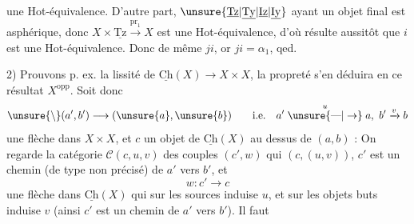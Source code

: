 une Hot-équivalence. D'autre part, $\unsure{\underline{\mathrm{Tz}}|\underline{\mathrm{Ty}}|\underline{\mathrm{Iz}}|\underline{\mathrm{Iy}}}$ ayant un objet final est asphérique, donc $X\times\underline{\mathrm{Tz}}\xrightarrow{\mathrm{pr}_1}X$ est une Hot-équivalence, d'où résulte aussitôt que $i$ est une Hot-équivalence. Donc de même $ji$, or $ji=\alpha_1$, qed.

2) Prouvons p. ex. la lissité de $\underline{\mathrm{Ch}}(X)\to X\times X$, la propreté s'en déduira en  ce résultat  $X^{\mathrm{opp}}$. Soit donc
\[
\unsure{\backslash}(a',b')\longrightarrow(\unsure{a},\unsure{b})\qquad\text{i.e.}\quad a'\mathrel{\overset{u}{\unsure{\text{---}|\to}}}a,\ b'\xrightarrow{v}b
\]
une flèche dans $X\times X$, et $c$ un objet de $\underline{\mathrm{Ch}}(X)$ au dessus de $(a,b)$ :
On regarde la catégorie $\mathcal C(c,u,v)$ des couples $(c',w)$ qui  $(c,(u,v))$,   $c'$ est un chemin (de type non précisé) de $a'$ vers $b'$, et 
\[
w:c'\longrightarrow c
\]
une flèche dans $\underline{\mathrm{Ch}}(X)$ qui sur les sources induise $u$, et sur les objets buts induise $v$ (ainsi $c'$ est un chemin de $a'$ vers $b'$). Il faut
